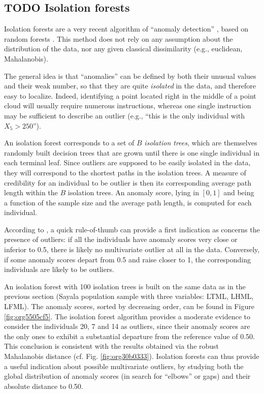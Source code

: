 \documentclass[review, 3p]{elsarticle}
\begin{document}
\subsection{{\bfseries\sffamily TODO} Isolation forests}
\label{sec:org2ca74d0}
Isolation forests are a very recent algorithm of ``anomaly detection'' \citep{liu2012_IsolationBasedAnomalyDetection}, based on random forests \citep{breiman2001_RandomForests}. This method does not rely on any assumption about the distribution of the data, nor any given classical dissimilarity (e.g., euclidean, Mahalanobis).

The general idea is that ``anomalies'' can be defined by both their unusual values and their weak number, so that they are quite \emph{isolated} in the data, and therefore easy to localize. Indeed, identifying a point located right in the middle of a point cloud will usually require numerous instructions, whereas one single instruction may be sufficient to describe an outlier (e.g., ``this is the only individual with \(X_5 > 250\)''). 

An isolation forest corresponds to a set of \(B\) \emph{isolation trees}, which are themselves randomly built decision trees that are grown until there is one single individual in each terminal leaf. Since outliers are supposed to be easily isolated in the data, they will correspond to the shortest paths in the isolation trees. A measure of credibility for an individual to be outlier is then its corresponding average path length within the \(B\) isolation trees. An anomaly score, lying in \([0,1]\) and being a function of the sample size and the average path length, is computed for each individual.

According to \cite{liu2012_IsolationBasedAnomalyDetection}, a quick rule-of-thumb can provide a first indication as concerns the presence of outliers: if all the individuals have anomaly scores very close or inferior to 0.5, there is likely no multivariate outlier at all in the data. Conversely, if some anomaly scores depart from 0.5 and raise closer to 1, the corresponding individuals are likely to be outliers.

An isolation forest with 100 isolation trees is built on the same data as in the previous section (Sayala population sample with three variables: LTML, LHML, LFML). The anomaly scores, sorted by decreasing order, can be found in Figure \ref{fig:org5505cf5}. The isolation forest algorithm provides a moderate evidence to consider the individuals 20, 7 and 14 as outliers, since their anomaly scores are the only ones to exhibit a substantial departure from the reference value of 0.50. This conclusion is consistent with the results obtained via the robust Mahalanobis distance (cf. Fig. \ref{fig:org30b0333}). Isolation forests can thus provide a useful indication about possible multivariate outliers, by studying both the global distribution of anomaly scores (in search for ``elbows'' or gaps) and their absolute distance to 0.50.
\end{document}
